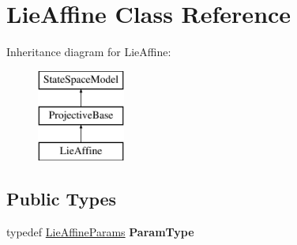 \hypertarget{classLieAffine}{\section{Lie\-Affine Class Reference}
\label{classLieAffine}
}
Inheritance diagram for Lie\-Affine\-:\begin{figure}[H]
\begin{center}
\leavevmode
\includegraphics[height=3.000000cm]{classLieAffine}
\end{center}
\end{figure}
\subsection*{Public Types}
\begin{DoxyCompactItemize}
\item 
\hypertarget{classLieAffine_ac6c68c809e3c76f1c54899d7a2bd4a3e}{typedef \hyperlink{structLieAffineParams}{Lie\-Affine\-Params} {\bfseries Param\-Type}}\label{classLieAffine_ac6c68c809e3c76f1c54899d7a2bd4a3e}

\end{DoxyCompactItemize}
